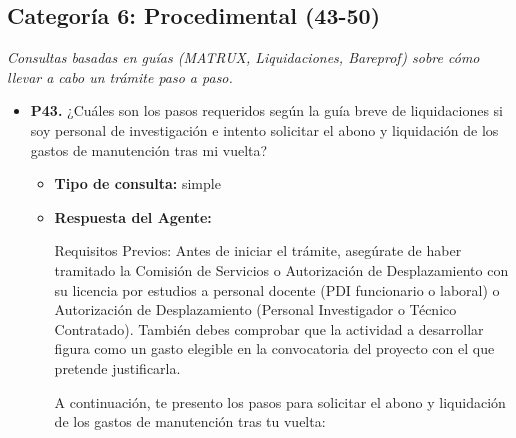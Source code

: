 \documentclass{article}
\begin{document}
\subsection{Categoría 6: Procedimental (43-50)}
\textit{Consultas basadas en guías (MATRUX, Liquidaciones, Bareprof) sobre cómo llevar a cabo un trámite paso a paso.}
\begin{itemize}
      \item \textbf{P43.} ¿Cuáles son los pasos requeridos según la guía breve de liquidaciones si soy personal de investigación e intento solicitar el abono y liquidación de los gastos de manutención tras mi vuelta? \\
            \begin{itemize}
                  \item \textbf{Tipo de consulta:} simple
                  \item \textbf{Respuesta del Agente:}

                        Requisitos Previos:
                        Antes de iniciar el trámite, asegúrate de haber tramitado la Comisión de Servicios o Autorización de Desplazamiento con su licencia por estudios a personal docente (PDI funcionario o laboral) o Autorización de Desplazamiento (Personal Investigador o Técnico Contratado). También debes comprobar que la actividad a desarrollar figura como un gasto elegible en la convocatoria del proyecto con el que pretende justificarla.

                        A continuación, te presento los pasos para solicitar el abono y liquidación de los gastos de manutención tras tu vuelta:


\end{itemize}
\end{itemize}
\end{document}
